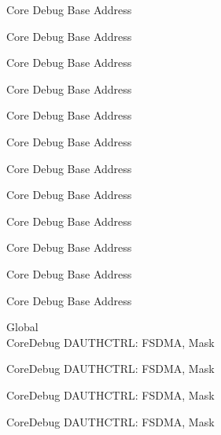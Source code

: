 \begin{DoxyRefList}
\label{deprecated__deprecated000371}%
%
Core Debug Base Address 

\label{deprecated__deprecated000447}%
%
Core Debug Base Address 

\label{deprecated__deprecated000550}%
%
Core Debug Base Address 

\label{deprecated__deprecated000652}%
%
Core Debug Base Address 

\label{deprecated__deprecated000777}%
%
Core Debug Base Address 

\label{deprecated__deprecated000831}%
%
Core Debug Base Address 

\label{deprecated__deprecated000907}%
%
Core Debug Base Address 

\label{deprecated__deprecated000970}%
%
Core Debug Base Address 

\label{deprecated__deprecated001049}%
%
Core Debug Base Address 

\label{deprecated__deprecated001125}%
%
Core Debug Base Address 

\label{deprecated__deprecated001228}%
%
Core Debug Base Address 

\label{deprecated__deprecated001330}%
%
Core Debug Base Address  
\item[Global \doxylink{group___c_m_s_i_s___s_c_b_gab7f3f76af0236f8d3d3a090f50d4841a}{Core\+Debug\+\_\+\+DAUTHCTRL\+\_\+\+FSDMA\+\_\+\+Msk} ]\hfill \\
\label{deprecated__deprecated000084}%
%
Core\+Debug DAUTHCTRL\+: FSDMA, Mask 

\label{deprecated__deprecated000535}%
%
Core\+Debug DAUTHCTRL\+: FSDMA, Mask 

\label{deprecated__deprecated000637}%
%
Core\+Debug DAUTHCTRL\+: FSDMA, Mask 

\label{deprecated__deprecated000762}%
%
Core\+Debug DAUTHCTRL\+: FSDMA, Mask 


\end{DoxyRefList}

